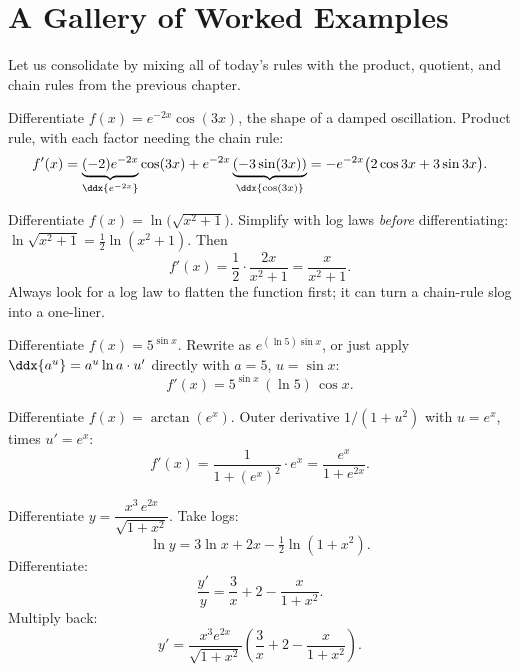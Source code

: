 \section{A Gallery of Worked Examples}
\label{ch12:gallery}

Let us consolidate by mixing all of today's rules with the product, quotient,
and chain rules from the previous chapter.

\begin{example}
\label{ch12:ex-damped}
Differentiate $f(x) = e^{-2x}\cos(3x)$, the shape of a damped oscillation.
Product rule, with each factor needing the chain rule:
\[
   f'(x) = \underbrace{(-2)e^{-2x}}_{\ddx{e^{-2x}}}\cos(3x)
         + e^{-2x}\underbrace{(-3\sin(3x))}_{\ddx{\cos(3x)}}
         = -e^{-2x}\big(2\cos 3x + 3\sin 3x\big).
\]
\end{example}

\begin{example}
\label{ch12:ex-log-comp}
Differentiate $f(x) = \ln\!\big(\sqrt{x^2+1}\big)$. Simplify with log laws
\emph{before} differentiating: $\ln\sqrt{x^2+1} = \tfrac12\ln(x^2+1)$. Then
\[
   f'(x) = \frac12\cdot\frac{2x}{x^2+1} = \frac{x}{x^2+1}.
\]
Always look for a log law to flatten the function first; it can turn a
chain-rule slog into a one-liner.
\end{example}

\begin{example}
\label{ch12:ex-base-change}
Differentiate $f(x) = 5^{\sin x}$. Rewrite as $e^{(\ln 5)\sin x}$, or just
apply $\ddx{a^u} = a^u\ln a\cdot u'$ directly with $a=5$, $u=\sin x$:
\[
   f'(x) = 5^{\sin x}\,(\ln 5)\,\cos x.
\]
\end{example}

\begin{example}
\label{ch12:ex-arctan-chain}
Differentiate $f(x) = \arctan(e^x)$. Outer derivative $1/(1+u^2)$ with
$u=e^x$, times $u' = e^x$:
\[
   f'(x) = \frac{1}{1+(e^x)^2}\cdot e^x = \frac{e^x}{1+e^{2x}}.
\]
\end{example}

\begin{example}
\label{ch12:ex-logdiff-2}
Differentiate $y = \dfrac{x^{3}\,e^{2x}}{\sqrt{1+x^2}}$. Take logs:
\[
   \ln y = 3\ln x + 2x - \tfrac12\ln(1+x^2).
\]
Differentiate:
\[
   \frac{y'}{y} = \frac{3}{x} + 2 - \frac{x}{1+x^2}.
\]
Multiply back:
\[
   y' = \frac{x^{3}e^{2x}}{\sqrt{1+x^2}}
        \left(\frac{3}{x} + 2 - \frac{x}{1+x^2}\right).
\]
\end{example}

